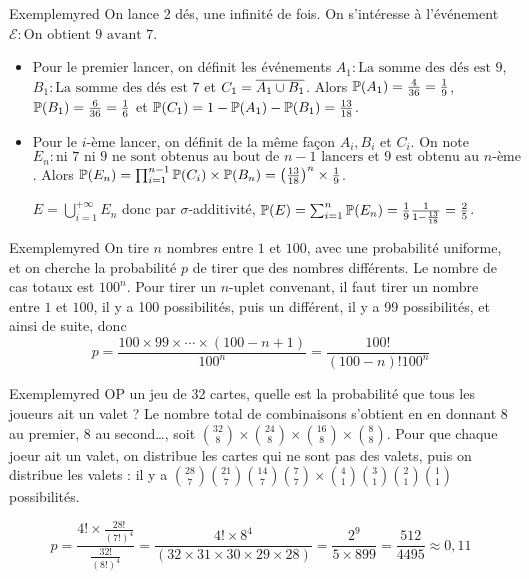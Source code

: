     \begin{omed}{Exemple}{myred}
        On lance 2 dés, une infinité de fois. On s’intéresse à l’événement $\mathcal{E} : \text{On obtient 9 avant 7}$.
        \begin{itemize}
            \item Pour le premier lancer, on définit les événements $A_1 : \text{La somme des dés est 9}$, $B_1 : \text{La somme des dés est 7}$ et $C_1 = \ovl{A_1 \cup B_1}$. Alors $\P(A_1) = \frac{4}{36} = \frac{1}{9}$, $\P(B_1) = \frac{6}{36} = \frac{1}{6}$ et $\P(C_1) = 1 - \P(A_1)- \P(B_1) = \frac{13}{18}$. 
            \item Pour le $i$-ème lancer, on définit de la même façon $A_i, B_i$ et $C_i$. On note $E_n : \text{ni 7 ni 9 ne sont obtenus au bout de } n-1 \text{ lancers et 9 est obtenu au } n\text{-ème}$. Alors $\P(E_n) = \prod_{i=1}^{n-1} \P(C_i) \times \P(B_n) = \left(\frac{13}{18}\right)^n \times \frac{1}{9}$. 
             
            $E = \bigcup_{i = 1}^{+\infty} E_n$ donc par $\sigma$-additivité, $\P(E) = \sum_{i=1}^n \P(E_n) = \frac{1}{9} \frac{1}{1 - \frac{13}{18}} = \frac{2}{5}$.
        \end{itemize}
    \end{omed}

    \begin{omed}{Exemple}{myred}
        On tire $n$ nombres entre $1$ et $100$, avec une probabilité uniforme, et on cherche la probabilité $p$ de tirer que des nombres différents. Le nombre de cas totaux est $100^n$. Pour tirer un $n$-uplet convenant, il faut tirer un nombre entre $1$ et $100$, il y a 100 possibilités, puis un différent, il y a 99 possibilités, et ainsi de suite, donc 
        \[ p = \frac{100 \times 99 \times \cdots \times (100 - n + 1)}{100^n} = \frac{100!}{(100 - n)! 100^n} \] 
    \end{omed}

    \begin{omed}{Exemple}{myred}
        OP un jeu de 32 cartes, quelle est la probabilité que tous les joueurs ait un valet ? Le nombre total de combinaisons s’obtient en en donnant $8$ au premier, $8$ au second\ldots, soit $\binom{32}{8} \times \binom{24}{8} \times \binom{16}{8} \times \binom{8}{8}$. Pour que chaque joeur ait un valet, on distribue les cartes qui ne sont pas des valets, puis on distribue les valets : il y a $\binom{28}{7} \binom{21}{7} \binom{14}{7} \binom{7}{7} \times \binom{4}{1} \binom{3}{1} \binom{2}{1} \binom{1}{1}$ possibilités.

        \[ p = \frac{4!\times \frac{28!}{(7!)^4}}{\frac{32!}{(8!)^4}} = \frac{4 ! \times 8^4}{(32 \times 31 \times 30 \times 29 \times 28)} = \frac{2^9}{5 \times 899} = \frac{512}{4495} \approx 0,11 \]
    \end{omed}

